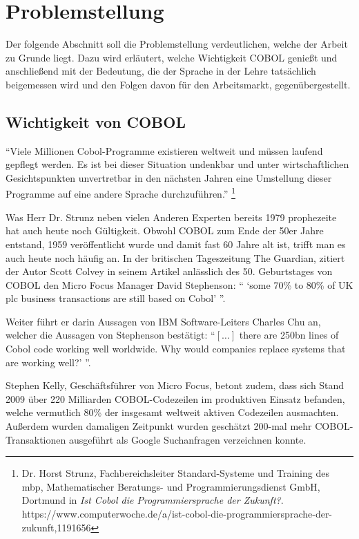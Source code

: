 \section{Problemstellung}\label{problemstellung}
Der folgende Abschnitt soll die Problemstellung verdeutlichen, welche der Arbeit zu Grunde liegt. 
Dazu wird erläutert, welche Wichtigkeit COBOL genießt und anschließend mit der Bedeutung, die der Sprache in der Lehre tatsächlich beigemessen wird und den Folgen davon für den Arbeitsmarkt, gegenübergestellt.

\subsection{Wichtigkeit von COBOL}
``Viele Millionen Cobol-Programme existieren weltweit und müssen laufend gepflegt werden.
Es ist bei dieser Situation undenkbar und unter wirtschaftlichen Gesichtspunkten unvertretbar in den nächsten Jahren eine Umstellung dieser Programme auf eine andere Sprache durchzuführen.'' \footnote{Dr. Horst Strunz, Fachbereichsleiter Standard-Systeme und Training des mbp, Mathematischer Beratungs- und Programmierungsdienst GmbH, Dortmund in \textit{Ist Cobol die Programmiersprache der Zukunft?}. \\ https://www.computerwoche.de/a/ist-cobol-die-programmiersprache-der-zukunft,1191656}

Was Herr Dr. Strunz neben vielen Anderen Experten bereits 1979 prophezeite hat auch heute noch Gültigkeit. Obwohl COBOL zum Ende der 50er Jahre entstand, 1959 veröffentlicht wurde und damit fast 60 Jahre alt ist, trifft man es auch heute noch häufig an. In der britischen Tageszeitung The Guardian, zitiert der Autor Scott Colvey in seinem Artikel %
\cite{colvey_cobol_2009} anlässlich des 50. Geburtstages von COBOL den Micro Focus Manager David Stephenson: `` `some 70\% to 80\% of UK plc business transactions are still based on Cobol' ''. 

Weiter führt er darin Aussagen von IBM Software-Leiters Charles Chu an, welcher die Aussagen von Stephenson bestätigt: ``$[\ldots]$ there are 250bn lines of Cobol code working well worldwide. Why would companies replace systems that are working well?' ''. 

Stephen Kelly, Geschäftsführer von Micro Focus, betont zudem, dass sich Stand 2009 über 220 Milliarden COBOL-Codezeilen im produktiven Einsatz befanden, welche vermutlich 80\% der insgesamt weltweit aktiven Codezeilen ausmachten. Außerdem wurden damaligen Zeitpunkt wurden geschätzt 200-mal mehr COBOL-Transaktionen ausgeführt als Google Suchanfragen verzeichnen konnte. \cite{kelly_cobol_2009}

